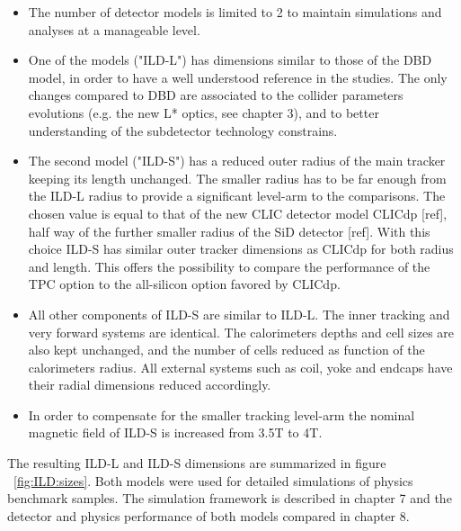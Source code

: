 \begin{itemize}
    
\item The number of detector models is limited to 2 to maintain simulations and analyses at a manageable level.

\item One of the models ("ILD-L") has dimensions similar to those of the DBD model, in order to have a well understood reference in the studies. The only changes compared to DBD are associated to the collider parameters evolutions (e.g. the new L* optics, see chapter 3), and to better understanding of the subdetector technology constrains.  

\item The second model ("ILD-S") has a reduced outer radius of the main tracker keeping its length unchanged. The smaller radius has to be far enough from the ILD-L radius to provide a significant level-arm to the comparisons. The chosen value is equal to that of the new CLIC detector model CLICdp [ref], half way of the further smaller radius of the SiD detector [ref]. With this choice ILD-S has similar outer tracker dimensions as CLICdp for both radius and length. This offers the possibility to compare the performance of the TPC option to the all-silicon option favored by CLICdp. 

\item All other components of ILD-S are similar to ILD-L. The inner tracking and very forward systems are identical. The calorimeters depths and cell sizes are also kept unchanged, and the number of cells reduced as function of the calorimeters radius. All external systems such as coil, yoke and endcaps have their radial dimensions reduced accordingly.

\item In order to compensate for the smaller tracking level-arm the nominal magnetic field of ILD-S is increased from 3.5T to 4T.

\end{itemize}

The resulting ILD-L and ILD-S dimensions are summarized in figure ~\ref{fig:ILD:sizes}. Both models were used for detailed simulations of physics benchmark samples. The simulation framework is described in chapter 7 and the detector and physics performance of both models compared in chapter 8.


